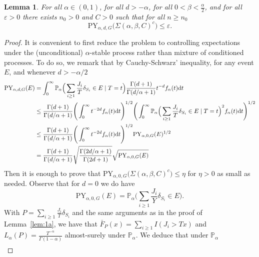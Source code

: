 \documentclass{article}
\newtheorem{lemma}{Lemma}
\newcommand{\1}{\boldsymbol{1}}
\newcommand{\PP}{\mathbb{P}}
\theoremstyle{plain}
\begin{document}
\begin{lemma}
  \label{lem:1b}
  For all $\alpha \in (0,1)$, for all $d > -\alpha$, for all $0 < \beta < \frac{\alpha}{2}$, and for all $\varepsilon > 0$ there exists $n_0 > 0$ and $C > 0$ such that for all $n \geq n_0$%
  \begin{equation*}
    \mathrm{PY}_{\alpha,d,G}\big(\Sigma(\alpha,\beta,C)^c \big) \leq \varepsilon.
  \end{equation*}
\end{lemma}
\begin{proof}
  It is convenient to first reduce the problem to controlling expectations under the (unconditional) $\alpha$-stable process rather than mixture of conditioned processes. To do so, we remark that by Cauchy-Schwarz' inequality, for any event $E$, and whenever $d > -\alpha/2$
  \begin{align*}
    \mathrm{PY}_{\alpha,d,G}(E)%
    &= \int_0^{\infty}\PP_{\alpha}\Big( \sum_{i\geq 1}\frac{J_i}{T}\delta_{S_i} \in E \mid T = t \Big) \frac{\Gamma(d+1)}{\Gamma(d/\alpha + 1)}t^{-d}f_{\alpha}(t)\intd t\\
    &\leq  \frac{\Gamma(d+1)}{\Gamma(d/\alpha + 1)}%
      \Bigg( \int_0^{\infty}t^{-2d}f_{\alpha}(t)\intd t \Bigg)^{1/2}%
      \Bigg( \int_0^{\infty}\PP_{\alpha}\Big( \sum_{i\geq 1}\frac{J_i}{T}\delta_{S_i} \in E \mid T = t \Big)^2 f_{\alpha}(t)\intd t \Bigg)^{1/2}\\
    &\leq \frac{\Gamma(d+1)}{\Gamma(d/\alpha + 1)}%
      \Bigg( \int_0^{\infty}t^{-2d}f_{\alpha}(t)\intd t \Bigg)^{1/2}%
      \mathrm{PY}_{\alpha,0,G}(E)^{1/2}\\
    &= \frac{\Gamma(d+1)}{\Gamma(d/\alpha + 1)}\sqrt{\frac{\Gamma(2d/\alpha + 1)}{\Gamma(2d+ 1)}}\sqrt{\mathrm{PY}_{\alpha,0,G}(E)}
  \end{align*}
  Then it is enough to prove that $\mathrm{PY}_{\alpha,0,G}\big(\Sigma(\alpha,\beta,C)^c \big) \leq \eta$ for $\eta > 0$ as small as needed. Observe that for $d = 0$ we do have
  \begin{equation*}
    \mathrm{PY}_{\alpha,0,G}(E)%
    = \PP_{\alpha}\Big(\sum_{i\geq 1}\frac{J_i}{Y}\delta_{S_i}\in E \Big).
  \end{equation*}
  With $P = \sum_{i\geq 1}\frac{J_i}{T}\delta_{S_i}$ and the same arguments as in the proof of Lemma~\ref{lem:1a}, we have that $\bar{F}_P(x) = \sum_{i\geq 1}I(J_i > Tx)$ and $L_{\alpha}(P) = \frac{T^{-\alpha}}{\Gamma(1-\alpha)}$ almost-surely under $\PP_{\alpha}$. We deduce that under $\PP_{\alpha}$
  \begin{align*}

\end{align*}
\end{proof}
\end{document}

